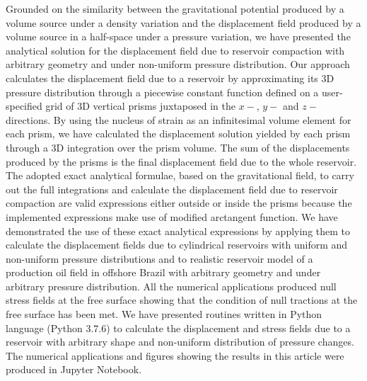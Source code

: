 \documentclass[journal abbreviation, manuscript]{copernicus}
\begin{document}
\conclusions  %
Grounded on the similarity between the gravitational potential produced by a volume source under a density variation and the displacement field produced by a volume source in a half-space under a pressure variation, we have presented the analytical solution for the displacement field due to reservoir compaction with arbitrary geometry and under non-uniform  pressure distribution.
Our approach calculates the displacement field due to a reservoir by approximating its 3D pressure distribution through a piecewise constant function defined on a user-specified grid of 3D vertical prisms juxtaposed in the $x-$, $y-$ and $z-$directions.
By using the nucleus of strain as an infinitesimal volume element for each prism, 
we have calculated the displacement solution yielded by each prism through a 3D integration over the prism volume. 
The sum of the displacements produced by the prisms is the final displacement field due to the whole reservoir.
The adopted exact analytical formulae, based on the gravitational field,  to carry out the full integrations and calculate the displacement field due to reservoir compaction are valid expressions either outside or inside the prisms because the implemented expressions make use of  modified arctangent function.
We have demonstrated the use of these exact analytical expressions by applying them to calculate the displacement fields due to cylindrical reservoirs with uniform and non-uniform pressure distributions and to realistic reservoir model of a production oil field in offshore Brazil with arbitrary geometry and under arbitrary pressure distribution.
All the numerical applications produced null stress fields  at the free surface
showing that the condition of null tractions at the free surface has been met. 
We have presented routines written in Python language (Python 3.7.6)  to calculate the displacement and stress fields due to a reservoir with arbitrary shape and non-uniform distribution of pressure changes. 
The numerical applications and figures showing the results in this article were produced in
Jupyter Notebook. 

\end{document}
